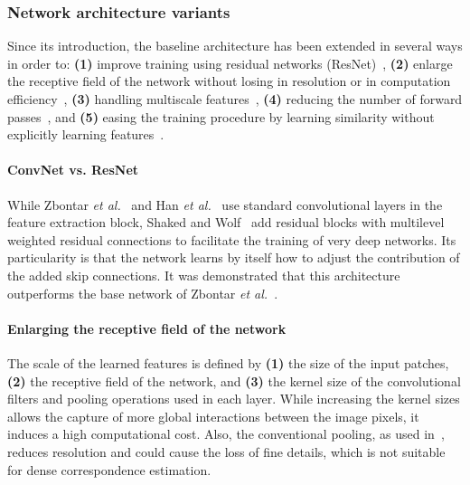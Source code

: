 \documentclass[10pt,journal,compsoc]{IEEEtran}
\newcommand{\etal}{\emph{et al.}}
\begin{document}
\subsubsection{Network architecture variants}

Since its introduction, the baseline architecture has been extended in several ways  in order to: \textbf{(1)} improve training using residual networks (ResNet)~\cite{shaked2017improved}, \textbf{(2)}   enlarge the receptive field of the network without losing in resolution or in computation efficiency~\cite{park2017look,ye2017efficient,Fu_2018_CVPR},  \textbf{(3)} handling multiscale features~\cite{zagoruyko2015learning,chen2015deep},  \textbf{(4)} reducing the number of forward passes~\cite{zagoruyko2015learning,luo2016efficient}, and \textbf{(5)} easing the training procedure by learning similarity without explicitly learning features~\cite{zagoruyko2015learning}. 




\paragraph{ConvNet vs. ResNet}
\label{sec:convnet_vs_resnet}

While Zbontar \etal~\cite{zbontar2015computing,zbontar2016stereo} and Han \etal~\cite{han2015matchnet} use standard convolutional layers in the feature extraction block,   Shaked and Wolf~\cite{shaked2017improved} add residual blocks with multilevel weighted residual connections to facilitate the training of very deep networks.   Its particularity is that the network  learns by itself how to adjust the contribution of the added skip connections.    It was demonstrated that this architecture outperforms  the base network of Zbontar \etal~\cite{zbontar2015computing}.   



\paragraph{Enlarging the receptive field of the network}
\label{sec:local_vs_global_context}

The  scale of the learned features is defined by \textbf{(1)} the size of the input patches,  \textbf{(2)} the receptive field of the network, and  \textbf{(3)} the kernel size of the convolutional filters and pooling operations used in each layer.  While increasing the kernel sizes allows the capture of more global interactions between the image pixels, it induces a high computational cost. Also, the conventional pooling,  as used in~\cite{zbontar2015computing,zbontar2016stereo},  reduces resolution and could cause the loss of fine details, which is not suitable  for dense correspondence estimation.
\end{document}
